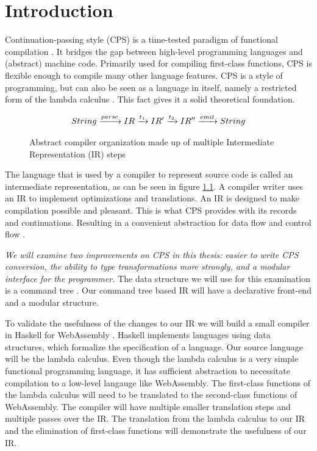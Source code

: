 
\chapter{\label{chap:introduction}Introduction}

Continuation-passing style (CPS) is a time-tested paradigm of functional compilation \autocite{steele1978rabbit, DBLP:books/daglib/0022396}. It bridges the gap between high-level programming languages and (abstract) machine code. Primarily used for compiling first-class functions, CPS is flexible enough to compile many other language features. CPS is a style of programming, but can also be seen as a language in itself, namely a restricted form of the lambda calculus \autocite{church2016calculi, barendregt1984lambda}. This fact gives it a solid theoretical foundation.

\begin{figure}
\begin{gather*}
  String \xrightarrow{parse} IR \xrightarrow{t_1} IR' \xrightarrow{t_2} IR'' \xrightarrow{emit} String
\end{gather*}
\caption{Abstract compiler organization made up of multiple Intermediate Representation (IR) steps}
\label{fig:comporg}
\end{figure}

The language that is used by a compiler to represent source code is called an intermediate representation, as can be seen in figure \ref{fig:comporg}. A compiler writer uses an IR to implement optimizations and translations. An IR is designed to make compilation possible and pleasant. This is what CPS provides with its records and continuations. Resulting in a convenient abstraction for data flow and control flow \autocite{bruin2020framevm}.

\textit{We will examine two improvements on CPS in this thesis: easier to write CPS conversion, the ability to type transformations more strongly, and a modular interface for the programmer.} The data structure we will use for this examination is a command tree \autocite{commandtreespoulsen}. Our command tree based IR will have a declarative front-end and a modular structure.

To validate the usefulness of the changes to our IR we will build a small compiler in Haskell \autocite{haskellhomepage} for WebAssembly \autocite{webassemblyhomepage}. Haskell implements languages using data structures, which formalize the specification of a language. Our source language will be the lambda calculus. Even though the lambda calculus is a very simple functional programming language, it has sufficient abstraction to necessitate compilation to a low-level langauge like WebAssembly. The first-class functions of the lambda calculus will need to be translated to the second-class functions of WebAssembly. The compiler will have multiple smaller translation steps and multiple passes over the IR. The translation from the lambda calculus to our IR and the elimination of first-class functions will demonstrate the usefulness of our IR.

